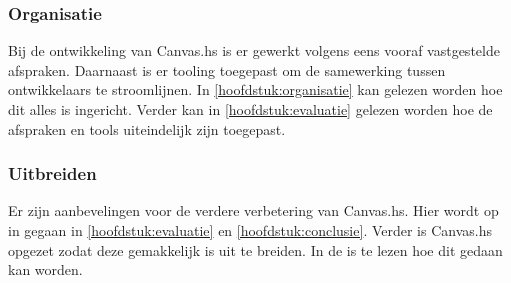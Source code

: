 \subsubsection{Organisatie}
Bij de ontwikkeling van Canvas.hs is er gewerkt volgens eens vooraf vastgestelde afspraken. Daarnaast is er tooling toegepast om de samewerking tussen ontwikkelaars te stroomlijnen. In \autoref{hoofdstuk:organisatie} kan gelezen worden hoe dit alles is ingericht. Verder kan in \autoref{hoofdstuk:evaluatie} gelezen worden hoe de afspraken en tools uiteindelijk zijn toegepast.

\subsubsection{Uitbreiden}
Er zijn aanbevelingen voor de verdere verbetering van Canvas.hs. Hier wordt op in gegaan in \autoref{hoofdstuk:evaluatie} en \autoref{hoofdstuk:conclusie}. Verder is Canvas.hs opgezet zodat deze gemakkelijk is uit te breiden. In de  is te lezen hoe dit gedaan kan worden.






